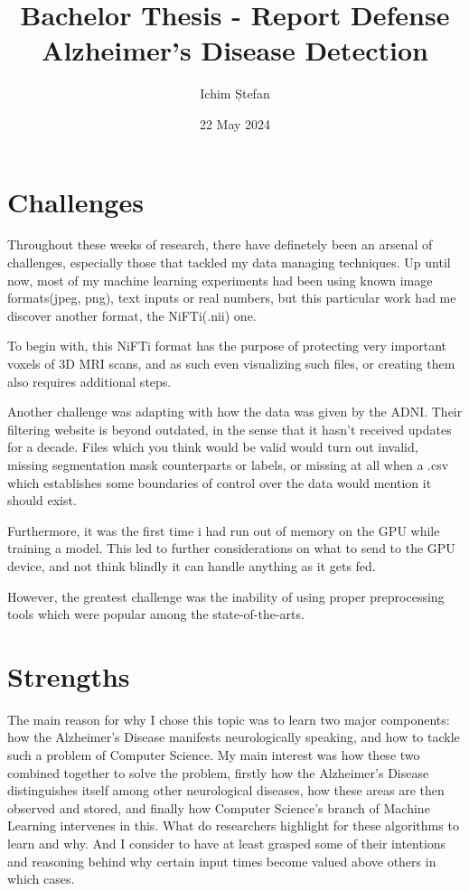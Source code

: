 \documentclass[a4paper]{article} %
\title{
    Bachelor Thesis - Report Defense \\
    Alzheimer's Disease Detection    
}
\author{Ichim Ștefan}
\date{22 May 2024}
\begin{document}

\maketitle %

\tableofcontents
\newpage

\section{Challenges}
Throughout these weeks of research, there have definetely been an arsenal of challenges, especially those that tackled my data managing techniques.
Up until now, most of my machine learning experiments had been using known image formats(jpeg, png), text inputs or real numbers, but this particular work
had me discover another format, the NiFTi(.nii) one.

To begin with, this NiFTi format has the purpose of protecting very important voxels of 3D MRI scans, and as such even visualizing such files, or creating them
also requires additional steps.

Another challenge was adapting with how the data was given by the ADNI. Their filtering website is beyond outdated, in the sense that it hasn't received updates
for a decade. Files which you think would be valid would turn out invalid, missing segmentation mask counterparts or labels, or missing at all when a .csv
which establishes some boundaries of control over the data would mention it should exist.

Furthermore, it was the first time i had run out of memory on the GPU while training a model. This led to further considerations on what to send to the
GPU device, and not think blindly it can handle anything as it gets fed.

However, the greatest challenge was the inability of using proper preprocessing tools which were popular among the state-of-the-arts.

\section{Strengths}
The main reason for why I chose this topic was to learn two major components: how the Alzheimer's Disease manifests neurologically speaking, and how
to tackle such a problem of Computer Science. My main interest was how these two combined together to solve the problem, firstly how the Alzheimer's Disease
distinguishes itself among other neurological diseases, how these areas are then observed and stored, and finally how Computer Science's branch of
Machine Learning intervenes in this. What do researchers highlight for these algorithms to learn and why. And I consider to have at least grasped
some of their intentions and reasoning behind why certain input times become valued above others in which cases.
\end{document}
